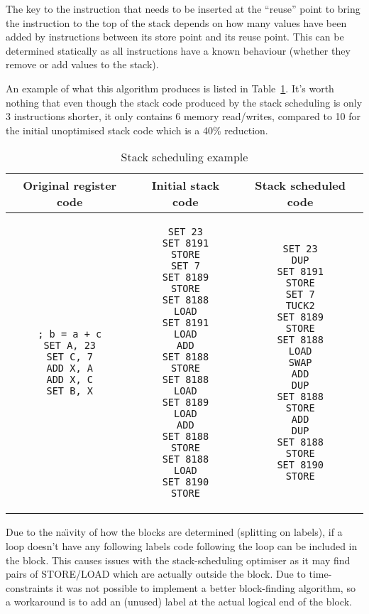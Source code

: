 The key to the instruction that needs to be inserted at the ``reuse'' point to
bring the instruction to the top of the stack depends on how many values have
been added by instructions between its store point and its reuse point. This can
be determined statically as all instructions have a known behaviour (whether
they remove or add values to the stack).

An example of what this algorithm produces is listed in
Table~\ref{tab:scheduleex}. It's worth nothing that even though the stack code
produced by the stack scheduling is only 3 instructions shorter, it only
contains 6 memory read/writes, compared to 10 for the initial unoptimised stack
code which is a 40\% reduction.

\begin{table}
\caption{Stack scheduling example}
\begin{tabular}{c c c}\label{tab:scheduleex}
  Original register code & Initial stack code & Stack scheduled code
  \\ \toprule
\begin{lstlisting}
; b = a + c
SET A, 23
SET C, 7
ADD X, A
ADD X, C
SET B, X
\end{lstlisting} &
\begin{lstlisting}
SET 23
SET 8191
STORE
SET 7
SET 8189
STORE
SET 8188
LOAD
SET 8191
LOAD
ADD
SET 8188
STORE
SET 8188
LOAD
SET 8189
LOAD
ADD
SET 8188
STORE
SET 8188
LOAD
SET 8190
STORE
\end{lstlisting} &
\begin{lstlisting}
SET 23
DUP
SET 8191
STORE
SET 7
TUCK2
SET 8189
STORE
SET 8188
LOAD
SWAP
ADD
DUP
SET 8188
STORE
ADD
DUP
SET 8188
STORE
SET 8190
STORE
\end{lstlisting} \\
\end{tabular}
\end{table}

Due to the na{\"\i}vity of how the blocks are determined (splitting on labels),
if a loop doesn't have any following labels code following the loop can be
included in the block. This causes issues with the stack-scheduling optimiser as
it may find pairs of STORE/LOAD which are actually outside the block. Due to
time-constraints it was not possible to implement a better block-finding
algorithm, so a workaround is to add an (unused) label at the actual logical end
of the block.
